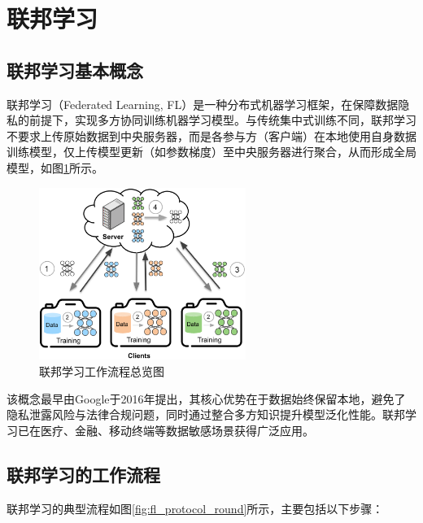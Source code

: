 \section{联邦学习}

\subsection{联邦学习基本概念}
联邦学习（Federated Learning, FL）是一种分布式机器学习框架，在保障数据隐私的前提下，实现多方协同训练机器学习模型\cite{yang2019federated}。与传统集中式训练不同，联邦学习不要求上传原始数据到中央服务器，而是各参与方（客户端）在本地使用自身数据训练模型，仅上传模型更新（如参数梯度）至中央服务器进行聚合，从而形成全局模型，如图\ref{fig:federated_learning_workflow}所示。

\begin{figure}[htbp]
    \centering
    \includegraphics[width=0.6\textwidth]{Imgs/FL-structure.png}
    \caption{联邦学习工作流程总览图}
    \label{fig:federated_learning_workflow}
\end{figure}

该概念最早由Google于2016年提出\cite{mcmahan2017communication}，其核心优势在于数据始终保留本地，避免了隐私泄露风险与法律合规问题，同时通过整合多方知识提升模型泛化性能。联邦学习已在医疗、金融、移动终端等数据敏感场景获得广泛应用\cite{zhang2024fedtgp, hard2018federated}。

\subsection{联邦学习的工作流程}
联邦学习的典型流程如图\ref{fig:fl_protocol_round}所示，主要包括以下步骤：

